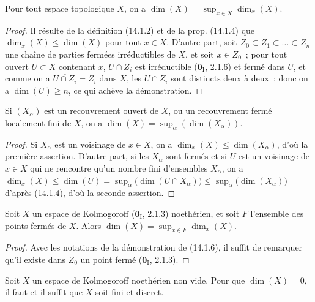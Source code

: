 \begin{proposition}[14.1.6]
\label{0.14.1.6-fr}
Pour tout espace topologique $X$, on a
$\dim(X)=\sup_{x\in X}\dim_x(X)$.
\end{proposition}

\begin{proof}
Il résulte de la définition (14.1.2) et de la prop. (14.1.4) que
$\dim_x(X)\leq\dim(X)$ pour tout $x\in X$. D'autre part, soit
$Z_0\subset Z_1\subset\ldots\subset Z_n$ une chaîne de parties fermées
irréductibles de $X$, et soit $x\in Z_0$~; pour tout ouvert $U\subset X$
contenant $x$, $U\cap Z_i$ est irréductible ($\mathbf{0}_{\mathrm I}$, 2.1.6) et
fermé dans $U$, et comme on a $\overline{U\cap Z_i}=Z_i$ dans $X$, les
$U\cap Z_i$ sont distincts deux à deux~; donc on a $\dim(U)\geq n$, ce qui
achève la démonstration.
\end{proof}

\begin{corollary}[14.1.7]
\label{0.14.1.7-fr}
Si $(X_\alpha)$ est un recouvrement ouvert de $X$, ou un recouvrement fermé
localement fini de $X$, on a
$\dim(X)=\sup_\alpha(\dim(X_\alpha))$.
\end{corollary}

\begin{proof}
Si $X_\alpha$ est un voisinage de $x\in X$, on a
$\dim_x(X)\leq\dim(X_\alpha)$, d'où la première assertion. D'autre part, si
les $X_\alpha$ sont fermés et si $U$ est un voisinage de $x\in X$ qui ne
rencontre qu'un nombre fini d'ensembles $X_\alpha$, on a
$\dim_x(X)\leq\dim(U)=\sup_\alpha\bigl(\dim(U\cap X_\alpha)\bigr)
\leq\sup_\alpha\bigl(\dim(X_\alpha)\bigr)$
d'après (14.1.4), d'où la seconde assertion.
\end{proof}

\begin{corollary}[14.1.8]
\label{0.14.1.8-fr}
Soit $X$ un espace de Kolmogoroff \textup{($\mathbf{0}_{\mathrm I}$, 2.1.3)} noethérien, et
soit $F$ l'ensemble des points fermés de $X$. Alors
$\dim(X)=\sup_{x\in F}\dim_x(X)$.
\end{corollary}

\begin{proof}
Avec les notations de la démonstration de (14.1.6), il suffit de remarquer
qu'il existe dans $Z_0$ un point fermé ($\mathbf{0}_{\mathrm I}$, 2.1.3).
\end{proof}

\begin{proposition}[14.1.9]
\label{0.14.1.9-fr}
Soit $X$ un espace de Kolmogoroff noethérien non vide. Pour que
$\dim(X)=0$, il faut et il suffit que $X$ soit fini et discret.
\end{proposition}

